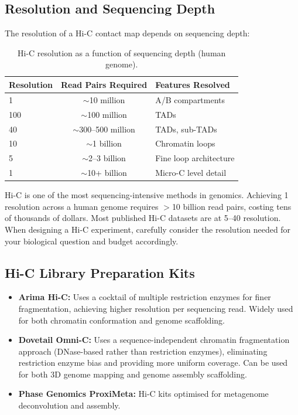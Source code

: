 \subsection{Resolution and Sequencing Depth}
\label{subsec:3dgenome:resolution}

The resolution of a Hi-C contact map depends on sequencing depth:

\begin{table}[htbp]
\centering
\caption{Hi-C resolution as a function of sequencing depth (human genome).}
\label{tab:3dgenome:resolution}
\small
\begin{tabular}{l c l}
\toprule
\textbf{Resolution} & \textbf{Read Pairs Required} & \textbf{Features Resolved} \\
\midrule
1\megabase{} & $\sim$10 million & A/B compartments \\
100\kilobase{} & $\sim$100 million & TADs \\
40\kilobase{} & $\sim$300--500 million & TADs, sub-TADs \\
10\kilobase{} & $\sim$1 billion & Chromatin loops \\
5\kilobase{} & $\sim$2--3 billion & Fine loop architecture \\
1\kilobase{} & $\sim$10+ billion & Micro-C level detail \\
\bottomrule
\end{tabular}
\end{table}

\begin{warningbox}
Hi-C is one of the most sequencing-intensive methods in genomics. Achieving 1\kilobase{} resolution across a human genome requires $>$10 billion read pairs, costing tens of thousands of dollars. Most published Hi-C datasets are at 5--40\kilobase{} resolution. When designing a Hi-C experiment, carefully consider the resolution needed for your biological question and budget accordingly.
\end{warningbox}

\subsection{Hi-C Library Preparation Kits}
\label{subsec:3dgenome:hic-kits}

\begin{itemize}[itemsep=2pt]
  \item \textbf{Arima Hi-C:} Uses a cocktail of multiple restriction enzymes for finer fragmentation, achieving higher resolution per sequencing read. Widely used for both chromatin conformation and genome scaffolding.
  \item \textbf{Dovetail Omni-C:} Uses a sequence-independent chromatin fragmentation approach (DNase-based rather than restriction enzymes), eliminating restriction enzyme bias and providing more uniform coverage. Can be used for both 3D genome mapping and genome assembly scaffolding.
  \item \textbf{Phase Genomics ProxiMeta:} Hi-C kits optimised for metagenome deconvolution and assembly.
\end{itemize}

